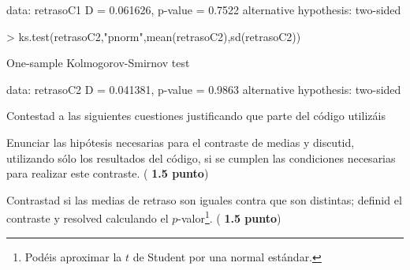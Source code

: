 \documentclass[10pt]{article}
\newcounter{punts} \def\thepunts{\arabic{punts}}
\def\punt{\addtocounter{punts}{1} \smallskip{\emph{\thepunts) }}}
\begin{document}
\begin{Schunk}
\begin{Soutput}
data:  retrasoC1
D = 0.061626, p-value = 0.7522
alternative hypothesis: two-sided
\end{Soutput}
\begin{Sinput}
> ks.test(retrasoC2,"pnorm",mean(retrasoC2),sd(retrasoC2))
\end{Sinput}
\begin{Soutput}
	One-sample Kolmogorov-Smirnov test

data:  retrasoC2
D = 0.041381, p-value = 0.9863
alternative hypothesis: two-sided
\end{Soutput}
\end{Schunk}


Contestad a las siguientes cuestiones justificando que parte del código utilizáis


\punt  Enunciar las hipótesis necesarias para  el contraste de medias y discutid, utilizando sólo los resultados del código, si se cumplen las condiciones necesarias para realizar este contraste. (\textbf{ 1.5 punto})

\punt Contrastad si  las medias de retraso son iguales contra  que son distintas; definid el contraste y resolved calculando el $p$-valor\footnote{Podéis aproximar la $t$ de Student por una normal estándar.}. (\textbf{ 1.5 punto})
\end{document}
